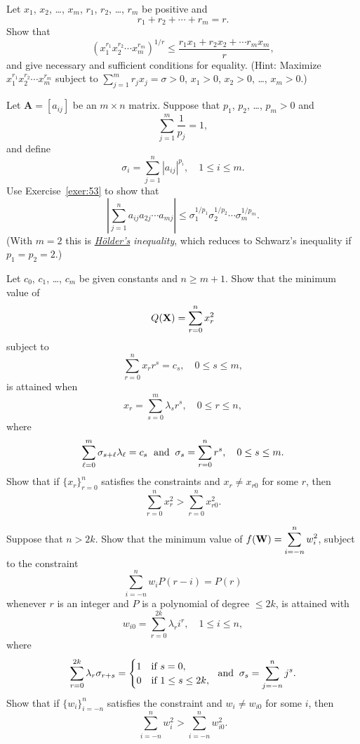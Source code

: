 \documentclass{article}
\newcommand{\dst}{\displaystyle}
\newcounter{exercise}
\newenvironment{exerciselist}{\begin{list}{\bf \arabic{exercise}.}
{\topsep 10pt\partopsep 0pt\labelwidth 16pt
\labelsep 12pt\leftmargin 28pt
\itemsep 8pt\usecounter{exercise}}}{\end{list}}
\begin{document}
\begin{exerciselist}
\item\label{exer:53}
Let $x_{1}$, $x_{2}$, \dots, $x_{m}$, $r_{1}$, $r_{2}$, \dots, $r_{m}$
be positive and
$$
r_{1}+r_{2}+\cdots+r_{m}=r.
$$
Show that
$$
\left(x_{1}^{r_{1}}x_{2}^{r_{2}}\cdots x_{m}^{r_{m}}\right)^{1/r}
 \le \frac{r_{1}x_{1}+r_{2}x_{2}+\cdots r_{m}x_{m}}{r},
$$
and give necessary and sufficient conditions for equality.
(Hint: Maximize $x_{1}^{r_{1}}x_{2}^{r_{2}}\cdots
x_{m}^{r_{m}}$ subject to $\sum_{j=1}^{m}r_{j}x_{j}=\sigma>0$,
$x_{1}>0$, $x_{2}>0$, \dots, $x_{m}>0$.)

\item\label{exer:54}
Let $\mathbf{A}=[a_{ij}]$ be an $m\times n$ matrix. Suppose that
$p_{1}$, $p_{2}$, \dots, $p_{m}>0$  and
$$
\sum_{j=1}^{m}\frac{1}{p_{j}}=1,
$$
and define
$$
\sigma_{i}=\sum_{j=1}^{n}|a_{ij}|^{p_{i}}, \quad 1 \le i \le m.
$$
Use Exercise~\ref{exer:53} to show that
$$
\left|\sum_{j=1}^{n}a_{ij}a_{2j}\cdots a_{mj}\right| \le
\sigma_{1}^{1/p_{1}}\sigma_{2}^{1/p_{2}}\cdots \sigma_{m}^{1/p_{m}}.
$$
(With $m=2$ this is
\href{http://www-history.mcs.st-and.ac.uk/Mathematicians/Holder.html}
{\emph{H\"{o}lder's}}
 \emph{inequality}, which  reduces to
Schwarz's
inequality if $p_{1}=p_{2}=2$.)

\item\label{exer:55}
Let $c_{0}$, $c_{1}$, \dots, $c_{m}$  be given constants and $n\ge m+1$.
Show that the minimum value of
$$
Q({\bf X})=\sum_{r=0}^{n}x_{r}^{2}
$$
subject to
$$
\sum_{r=0}^{n}x_{r}r^{s}=c_{s},\quad 0\le s \le  m,
$$
is attained when
$$
x_{r}=\sum_{s=0}^{m}\lambda_{s}r^{s},\quad 0\le r\le n,
$$
where
$$
\sum_{\ell=0}^{m}\sigma_{s+\ell}\lambda_{\ell}=c_{s}
\text{\; and\;\;} \sigma_{s}= \sum_{r=0}^{n}r^{s},\quad 0\le s\le m.
$$
Show  that if
 $\{x_{r}\}_{r=0}^{n}$ satisfies the constraints and
$x_{r}\ne x_{r0}$ for some $r$, then
$$
\sum_{r=0}^{n}x_{r}^{2}>\sum_{r=0}^{n}x_{r0}^{2}.
$$

\item\label{exer:56}
Suppose that $n> 2k$. Show that the minimum value of
$f({\bf W})=\dst{\sum_{i=-n}^{n}w_{i}^{2}}$, subject to the constraint
$$
\sum_{i=-n}^{n}w_{i}P(r-i)=P(r)
$$
whenever $r$  is an integer and $P$ is a polynomial of degree $\le 2k$,
is attained with
$$
w_{i0}=\sum_{r=0}^{2k}\lambda_{r}i^{r},\quad 1\le i\le n,
$$
where
$$
\sum_{r=0}^{2k}\lambda_{r}\sigma_{r+s}=
\begin{cases} 1& \text{if } s=0,\\ 0&\text{if  }1\le s\le 2k,  \end{cases}
\text{\; and\;\;}
 \sigma_{s}=\sum_{j=-n}^{n}j^{s}.
$$
Show  that if
 $\{w_{i}\}_{i=-n}^{n}$ satisfies the constraint and
$w_{i}\ne w_{i0}$ for some $i$, then
$$
\sum_{i=-n}^{n}w_{i}^{2}>\sum_{i=-n}^{n}w_{i0}^{2}.
$$


\end{exerciselist}
\end{document}
